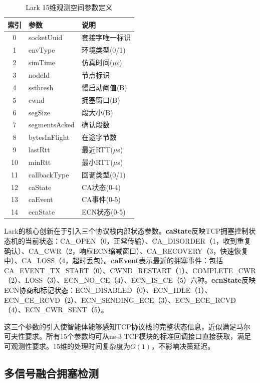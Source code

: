 \documentclass[10pt,twocolumn]{article}
\begin{document}
\begin{table}[htbp]
\centering
\caption{Lark 15维观测空间参数定义}
\label{tab:observation}
\small
\begin{tabular}{clp{3.2cm}}
\toprule
\textbf{索引} & \textbf{参数} & \textbf{说明} \\
\midrule
0 & socketUuid & 套接字唯一标识 \\
1 & envType & 环境类型(0/1) \\
2 & simTime & 仿真时间($\mu$s) \\
3 & nodeId & 节点标识 \\
4 & ssthresh & 慢启动阈值(B) \\
5 & cwnd & 拥塞窗口(B) \\
6 & segSize & 段大小(B) \\
7 & segmentsAcked & 确认段数 \\
8 & bytesInFlight & 在途字节数 \\
9 & lastRtt & 最近RTT($\mu$s) \\
10 & minRtt & 最小RTT($\mu$s) \\
11 & callbackType & 回调类型(0/1) \\
12 & caState & CA状态(0-4) \\
13 & caEvent & CA事件(0-5) \\
14 & ecnState & ECN状态(0-5) \\
\bottomrule
\end{tabular}
\end{table}

Lark的核心创新在于引入三个协议栈内部状态参数。\textbf{caState}反映TCP拥塞控制状态机的当前状态：CA\_OPEN（0，正常传输）、CA\_DISORDER（1，收到重复确认）、CA\_CWR（2，响应ECN缩减窗口）、CA\_RECOVERY（3，快速恢复中）、CA\_LOSS（4，超时丢包）。\textbf{caEvent}表示最近的拥塞事件：包括CA\_EVENT\_TX\_START（0）、CWND\_RESTART（1）、COMPLETE\_CWR（2）、LOSS（3）、ECN\_NO\_CE（4）、ECN\_IS\_CE（5）六种。\textbf{ecnState}反映ECN协商和标记状态：ECN\_DISABLED（0）、ECN\_IDLE（1）、ECN\_CE\_RCVD（2）、ECN\_SENDING\_ECE（3）、ECN\_ECE\_RCVD（4）、ECN\_CWR\_SENT（5）。

这三个参数的引入使智能体能够感知TCP协议栈的完整状态信息，近似满足马尔可夫性要求。所有15个参数均可从ns-3 TCP模块的标准回调接口直接获取，满足可观测性要求。15维的处理时间复杂度为$O(1)$，不影响决策延迟。

\subsection{多信号融合拥塞检测}
\end{document}
